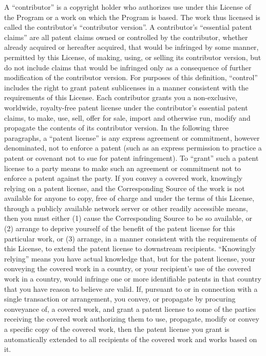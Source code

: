 \documentclass{article}
\begin{document}
\begin{enumerate}[\hspace{-18pt}1.]
A ``contributor'' is a copyright holder who authorizes use under this License of the Program or a work on which the Program is based.  The work thus licensed is called the contributor's ``contributor version''.
A contributor's ``essential patent claims'' are all patent claims owned or controlled by the contributor, whether already acquired or hereafter acquired, that would be infringed by some manner, permitted by this License, of making, using, or selling its contributor version, but do not include claims that would be infringed only as a consequence of further modification of the contributor version.  For purposes of this definition, ``control'' includes the right to grant patent sublicenses in a manner consistent with the requirements of this License.
Each contributor grants you a non-exclusive, worldwide, royalty-free patent license under the contributor's essential patent claims, to make, use, sell, offer for sale, import and otherwise run, modify and propagate the contents of its contributor version.
In the following three paragraphs, a ``patent license'' is any express agreement or commitment, however denominated, not to enforce a patent (such as an express permission to practice a patent or covenant not to sue for patent infringement).  To ``grant'' such a patent license to a party means to make such an agreement or commitment not to enforce a patent against the party.
If you convey a covered work, knowingly relying on a patent license, and the Corresponding Source of the work is not available for anyone to copy, free of charge and under the terms of this License, through a publicly available network server or other readily accessible means, then you must either (1) cause the Corresponding Source to be so available, or (2) arrange to deprive yourself of the benefit of the patent license for this particular work, or (3) arrange, in a manner consistent with the requirements of this License, to extend the patent license to downstream recipients.  ``Knowingly relying'' means you have actual knowledge that, but for the patent license, your conveying the covered work in a country, or your recipient's use of the covered work in a country, would infringe one or more identifiable patents in that country that you have reason to believe are valid.
If, pursuant to or in connection with a single transaction or arrangement, you convey, or propagate by procuring conveyance of, a covered work, and grant a patent license to some of the parties receiving the covered work authorizing them to use, propagate, modify or convey a specific copy of the covered work, then the patent license you grant is automatically extended to all recipients of the covered work and works based on it.

\end{enumerate}
\end{document}

